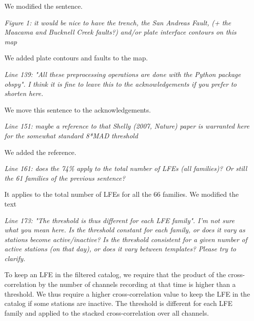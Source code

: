 \documentclass[letterpaper, 12pt]{article}
\begin{document}
\bigskip

We modified the sentence.

\bigskip

\textit{Figure 1: it would be nice to have the trench, the San Andreas Fault, (+ the Maacama and Bucknell Creek faults?) and/or plate interface contours on this map}

\bigskip

We added plate contours and faults to the map.

\bigskip

\textit{Line 139: "All these preprocessing operations are done with the Python package obspy". I think it is fine to leave this to the acknowledgements if you prefer to shorten here.}

\bigskip

We move this sentence to the acknowledgements.

\bigskip

\textit{Line 151: maybe a reference to that Shelly (2007, Nature) paper is warranted here for the somewhat standard 8*MAD threshold}

\bigskip

We added the reference.

\bigskip

\textit{Line 161: does the 74\% apply to the total number of LFEs (all families)? Or still the 61 families of the previous sentence?}

\bigskip

It applies to the total number of LFEs for all the 66 families. We modified the text

\bigskip

\textit{Line 173: "The threshold is thus different for each LFE family". I'm not sure what you mean here. Is the threshold constant for each family, or does it vary as stations become active/inactive? Is the threshold consistent for a given number of active stations (on that day), or does it vary between templates? Please try to clarify.}

\bigskip

To keep an LFE in the filtered catalog, we require that the product of the cross-correlation by the number of channels recording at that time is higher than a threshold. We thus require a higher cross-correlation value to keep the LFE in the catalog if some stations are inactive. The threshold is different for each LFE family and applied to the stacked cross-correlation over all channels.

\bigskip
\end{document}

